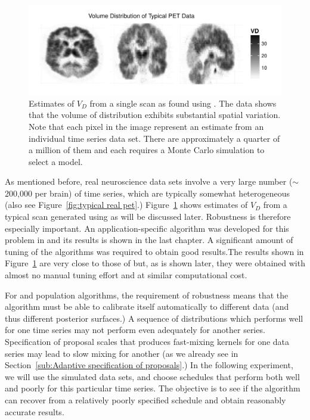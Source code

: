 \begin{figure}[t]
  \includegraphics[width=\linewidth]{fig/PETPlot-smc2-ps-bw}
  \caption{Estimates of $V_D$ from a single \pet scan as found using \smc[2].
    The data shows that the volume of distribution exhibits substantial
    spatial variation. Note that each pixel in the image represent an estimate
    from an individual time series data set. There are approximately a quarter
    of a million of them and each requires a Monte Carlo simulation to select
    a model.}
  \label{fig:petplot}
\end{figure}

As mentioned before, real neuroscience data sets involve a very large number
($\sim$200,000 per brain) of time series, which are typically somewhat
heterogeneous (also see Figure~\ref{fig:typical real pet}.)
Figure~\ref{fig:petplot} shows estimates of $V_D$ from a typical \pet scan
generated using \smc[2] as will be discussed later. Robustness is therefore
especially important. An application-specific \mcmc algorithm was developed
for this problem in \cite{Zhou2013} and its results is shown in the last
chapter. A significant amount of tuning of the algorithms was required to
obtain good results.The results shown in Figure~\ref{fig:petplot} are very
close to those of \cite{Zhou2013} but, as is shown later, they were obtained
with almost no manual tuning effort and at similar computational cost.

For \smc and population \mcmc algorithms, the requirement of robustness means
that the algorithm must be able to calibrate itself automatically to different
data (and thus different posterior surfaces.) A sequence of distributions
which performs well for one time series may not perform even adequately for
another series. Specification of proposal scales that produces fast-mixing
kernels for one data series may lead to slow mixing for another (as we already
see in Section~\ref{sub:Adaptive specification of proposals}.) In the
following experiment, we will use the simulated data sets, and choose
schedules that perform both well and poorly for this particular time series.
The objective is to see if the algorithm can recover from a relatively poorly
specified schedule and obtain reasonably accurate results.

